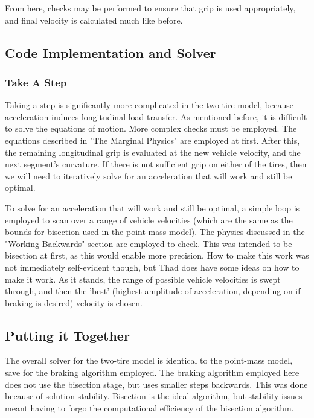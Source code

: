 \documentclass{article}
\begin{document}
From here, checks may be performed to ensure that grip is used appropriately, and final velocity is calculated much like before.



\subsection{Code Implementation and Solver}

\subsubsection{Take A Step}

Taking a step is significantly more complicated in the two-tire model, because acceleration induces longitudinal load transfer. As mentioned before, it is difficult to solve the equations of motion. More complex checks must be employed. The equations described in "The Marginal Physics" are employed at first. After this, the remaining longitudinal grip is evaluated at the new vehicle velocity, and the next segment's curvature. If there is not sufficient grip on either of the tires, then we will need to iteratively solve for an acceleration that will work and still be optimal.

To solve for an acceleration that will work and still be optimal, a simple loop is employed to scan over a range of vehicle velocities (which are the same as the bounds for bisection used in the point-mass model). The physics discussed in the "Working Backwards" section are employed to check. This was intended to be bisection at first, as this would enable more precision. How to make this work was not immediately self-evident though, but Thad does have some ideas on how to make it work. As it stands, the range of possible vehicle velocities is swept through, and then the 'best' (highest amplitude of acceleration, depending on if braking is desired) velocity is chosen.

\subsection{Putting it Together}

The overall solver for the two-tire model is identical to the point-mass model, save for the braking algorithm employed. The braking algorithm employed here does not use the bisection stage, but uses smaller steps backwards. This was done because of solution stability. Bisection is the ideal algorithm, but stability issues meant having to forgo the computational efficiency of the bisection algorithm.
\end{document}
